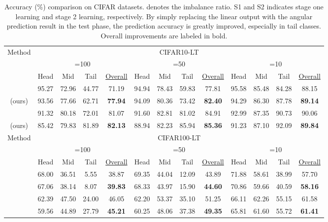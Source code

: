 \documentclass[10pt,twocolumn,letterpaper]{article}
\begin{document}
\begin{table*}[tb!]
\caption{Accuracy (\%) comparison on CIFAR datasets.  denotes the imbalance ratio. S1 and S2 indicates stage one learning and stage 2 learning, respectively. By simply replacing the linear output with the angular prediction result in the test phase, the prediction accuracy is greatly improved, especially in tail classes. Overall improvements are labeled in bold.}\vspace{-5pt}
\begin{tabular}{ccccccccccccc}
\hline
\multicolumn{1}{c|}{\multirow{3}{*}{Method}} & \multicolumn{12}{c}{CIFAR10-LT}  \\
\multicolumn{1}{c|}{}                        & \multicolumn{4}{c}{=100}     & \multicolumn{4}{c}{=50}   & \multicolumn{4}{c}{=10}  \\
\multicolumn{1}{c|}{}    & Head       & Mid     & Tail     & \underline{Overall} & Head   & Mid    & Tail   & \underline{Overall} & Head      & Mid     & Tail  & \underline{Overall}                   \\ \hline
~\cite{mislas}  & 95.27  & 72.96  & 44.77  & 71.19  & 94.94 & 78.43  & 59.83   & 77.81   & 95.58   & 85.48  & 84.28   & 88.15                     \\
 (ours) & 93.56  & 77.66  & 62.71  & \textbf{77.94}  & 94.09 & 80.36  & 73.42   & \textbf{82.40}   & 94.29   & 86.30  & 87.78   & \textbf{89.14}  \\
~\cite{mislas}  & 91.32  & 80.18  & 72.01  & 81.07   & 91.60   & 82.81  & 81.02  & 84.91  & 92.99   & 87.35  & 90.73  & 90.06    \\
 (ours)  & 85.42   & 79.83   & 81.89  & \textbf{82.13}   & 88.94  & 82.23  & 85.94  & \textbf{85.36}   & 91.23  & 87.10   & 92.09   & \textbf{89.84}   \\ \hline
\multicolumn{1}{c|}{\multirow{3}{*}{Method}} & \multicolumn{12}{c}{CIFAR100-LT}                        \\
\multicolumn{1}{c|}{}                        & \multicolumn{4}{c}{=100}   & \multicolumn{4}{c}{=50}  & \multicolumn{4}{c}{=10}   \\
\multicolumn{1}{c|}{}  & Head  & Mid  & Tail & \underline{Overall} & Head   & Mid     & Tail    & \underline{Overall} & Head     & Mid     & Tail  & \underline{Overall}   \\ \hline
~\cite{mislas}   & 68.00   & 36.51  & 5.55    & 38.87    & 69.35  & 44.04   & 12.09    & 43.89  & 71.88   & 58.61    & 38.99  & 57.70  \\
 & 67.06 & 38.14 & 8.07 & \textbf{39.83}  & 68.33 & 43.97 & 15.90 & \textbf{44.60} & 70.86 & 59.66 & 40.59 & \textbf{58.16} \\
~\cite{mislas}  & 62.39 & 47.50 & 24.00 & 46.05 & 62.20 & 53.37 & 35.10 & 51.25 & 66.11 & 62.26 & 55.15 & 61.58 \\
 & 59.56 & 44.89 & 27.79 & \textbf{45.21} & 60.25 & 48.06 & 37.38 & \textbf{49.35} & 65.81 & 61.60 & 55.72 & \textbf{61.41} \\ \hline
\end{tabular}
\label{tab:cifar}
\end{table*}
\end{document}
